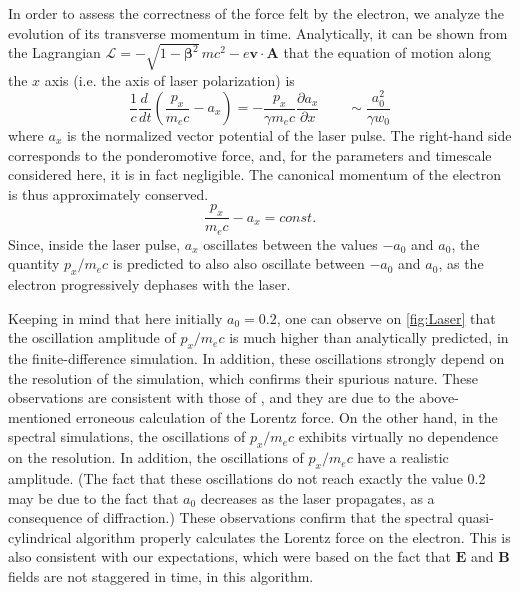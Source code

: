 \documentclass[1p,times,authoryear]{elsarticle}
\renewcommand{\vec}[1]{\boldsymbol{#1}}
\begin{document}
In order to assess the correctness of the force felt by the electron,
we analyze the evolution of its transverse momentum in
time. Analytically, it can be shown from the Lagrangian 
$\mathcal{L} = - \sqrt{1-\vec{\beta}^2} \,mc^2 - e \vec{v} \cdot
\vec{A}$ that the equation of motion along the $x$ axis (i.e. the axis of laser polarization) is 
\[ \frac{1}{c}\frac{d \,}{dt} \left( \frac{p_x}{m_e c} - a_x \right) =
 - \frac{p_x}{\gamma m_e c}\frac{\partial a_x}{\partial x} \qquad \sim
\frac{a_0^2}{\gamma w_0} \]
\noindent where $a_x$ is the normalized vector potential of the laser
pulse. The right-hand side corresponds to the ponderomotive force, and,
for the parameters and timescale considered here, it is in fact
negligible. The canonical momentum of the
electron is thus approximately conserved.
\[ \frac{p_x}{m_e c} - a_x  = const. \]
\noindent Since, inside the laser pulse, $a_x$ oscillates between the values $-a_0$ and $a_0$,
the quantity $p_x/m_e c$ is predicted to also also oscillate
between $-a_0$ and $a_0$, as the electron progressively
dephases with the laser. 

Keeping in mind that here initially $a_0=0.2$, one can observe on
\cref{fig:Laser} that the oscillation amplitude of $p_x/m_e c$
is much higher than analytically predicted, in the finite-difference
simulation. In addition, these oscillations strongly depend on the
resolution of the simulation, which confirms their spurious nature. These
observations are consistent with those of \citep{LehePRSTAB2014}, and
they are due to the above-mentioned erroneous calculation of the
Lorentz force. On the other hand, in the spectral simulations, the
oscillations of $p_x/m_e c$ exhibits virtually no dependence on the
resolution. In addition, the oscillations of $p_x/m_e c$ have a realistic
amplitude. (The fact that these oscillations do not reach exactly the
value 0.2 may be due to the fact that $a_0$ decreases as the laser
propagates, as a consequence of diffraction.) These observations
confirm that the spectral quasi-cylindrical algorithm properly calculates
the Lorentz force on the electron. This is also consistent with our
expectations, which were based on the fact that $\vec{E}$ and
$\vec{B}$ fields are not staggered in time, in this algorithm.
\end{document}
